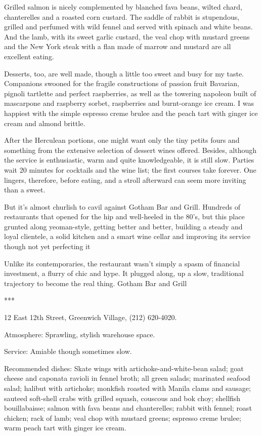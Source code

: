 Grilled salmon is nicely complemented by blanched fava beans, wilted
chard, chanterelles and a roasted corn custard. The saddle of rabbit is
stupendous, grilled and perfumed with wild fennel and served with
spinach and white beans. And the lamb, with its sweet garlic custard,
the veal chop with mustard greens and the New York steak with a flan
made of marrow and mustard are all excellent eating.

Desserts, too, are well made, though a little too sweet and busy for my
taste. Companions swooned for the fragile constructions of passion fruit
Bavarian, pignoli tartlette and perfect raspberries, as well as the
towering napoleon built of mascarpone and raspberry sorbet, raspberries
and burnt-orange ice cream. I was happiest with the simple espresso
creme brulee and the peach tart with ginger ice cream and almond
brittle.

After the Herculean portions, one might want only the tiny petits fours
and something from the extensive selection of dessert wines offered.
Besides, although the service is enthusiastic, warm and quite
knowledgeable, it is still slow. Parties wait 20 minutes for cocktails
and the wine list; the first courses take forever. One lingers,
therefore, before eating, and a stroll afterward can seem more inviting
than a sweet.

But it's almost churlish to cavil against Gotham Bar and Grill. Hundreds
of restaurants that opened for the hip and well-heeled in the 80's, but
this place grunted along yeoman-style, getting better and better,
building a steady and loyal clientele, a solid kitchen and a smart wine
cellar and improving its service though not yet perfecting it

Unlike its contemporaries, the restaurant wasn't simply a spasm of
financial investment, a flurry of chic and hype. It plugged along, up a
slow, traditional trajectory to become the real thing. Gotham Bar and
Grill

***

12 East 12th Street, Greenwich Village, (212) 620-4020.

Atmosphere: Sprawling, stylish warehouse space.

Service: Amiable though sometimes slow.

Recommended dishes: Skate wings with artichoke-and-white-bean salad;
goat cheese and caponata ravioli in fennel broth; all green salads;
marinated seafood salad; halibut with artichoke; monkfish roasted with
Manila clams and sausage; sauteed soft-shell crabs with grilled squash,
couscous and bok choy; shellfish bouillabaisse; salmon with fava beans
and chanterelles; rabbit with fennel; roast chicken; rack of lamb; veal
chop with mustard greens; espresso creme brulee; warm peach tart with
ginger ice cream.

